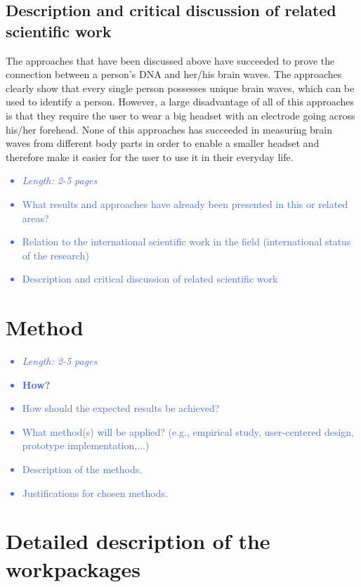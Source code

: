\documentclass[a4paper,11pt]{article}
\providecommand*{\note}[1]{\small \textcolor{RoyalBlue}{\begin{minipage}{\textwidth}{#1}\end{minipage}}}
\begin{document}
\subsection{Description and critical discussion of related scientific work}
The approaches that have been discussed above have succeeded to prove the connection between a person's DNA and her/his brain waves. The approaches clearly show that every single person possesses unique brain waves, which can be used to identify a person. However, a large disadvantage of all of this approaches is that they require the user to wear a big headset with an electrode going across his/her forehead. None of this approaches has succeeded in measuring brain waves from different body parts in order to enable a smaller headset and therefore make it easier for the user to use it in their everyday life.


\note{
\begin{itemize}
\item {\em Length: 2-5 pages}
\item What results and approaches have already been presented in this or related areas?
\item Relation to the international scientific work in the field (international status of the research)
\item Description and critical discussion of related scientific work
\end{itemize}
}

\section{Method}
\label{sect:method}

\note{
\begin{itemize}
\item {\em Length: 2-5 pages}
\item {\bf How?}
\item How should the expected results be achieved?
\item What method(s) will be applied? (e.g., empirical study, user-centered design, prototype implementation,...)
\item Description of the methods.
\item Justifications for chosen methods.
\end{itemize}
}

\section{Detailed description of the workpackages}
\label{sect:workplan}
\end{document}
